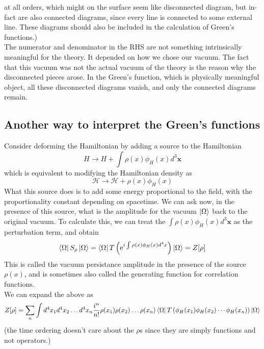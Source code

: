 \documentclass[11pt]{article}
\newcommand{\e}{\mathrm{e}}
\newcommand{\hd}{\mathcal{H}}
\numberwithin{equation}{section}
\begin{document}
at all orders, which might on the surface seem like disconnected diagram, but in-fact are also connected diagrams, since every line is connected to some external line. These diagrams should also be included in the calculation of Green's functions.)\\

The numerator and denominator in the RHS are not something intrinsically meaningful for the theory. It depended on how we chose our vacuum. The fact that this vacuum was not the actual vacuum of the theory is the reason why the disconnected pieces arose. In the Green's function, which is physically meaningful object, all these disconnected diagrams vanish, and only the connected diagrams remain.

\subsection{Another way to interpret the Green's functions}
Consider deforming the Hamiltonian by adding a source to the Hamiltonian 
\begin{equation*}
    H \to H + \int \rho(x) \phi_H(x) d^3\textbf{x}
\end{equation*}
which is equivalent to modifying the Hamiltonian density as 
\begin{equation*}
    \hd \to \hd + \rho(x) \phi_H(x)
\end{equation*}
What this source does is to add some energy proportional to the field, with the proportionality constant depending on spacetime. We can ask now, in the presence of this source, what is the amplitude for the vacuum \(\ket{\Omega}\) back to the original vacuum. To calculate this, we can treat the \(\int \rho(x)\phi_H(x)d^3\textbf{x}\) as the perturbation term, and obtain 
\begin{equation*}
    \bra{\Omega}S_\rho \ket{\Omega} = \bra{\Omega} T\left(\e^{i\int \rho(x)\phi_H(x)d^4x} \right) \ket{\Omega}  = Z[\rho]
\end{equation*}
This is called the vacuum persistance amplitude in the presence of the source \(\rho(x)\), and is sometimes also called the generating function for correlation functions.\\
We can expand the above as 
\begin{equation*}
    Z[\rho] = \sum_n \int d^4x_1 d^4x_2 \ldots d^4x_n \frac{i^n}{n!} \rho(x_1)\rho(x_2)\ldots\rho(x_n)\bra{\Omega} T\left(  \phi_H(x_1)\phi_H(x_2)\cdots \phi_H(x_n) \right) \ket{\Omega}
\end{equation*}
(the time ordering doesn't care about the \(\rho\)s since they are simply functions and not operators.)\\
\end{document}
